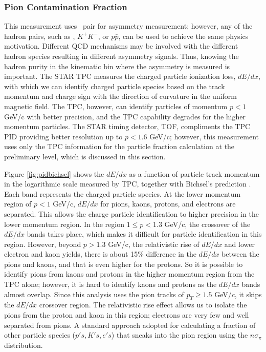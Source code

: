 \subsubsection{Pion Contamination Fraction}
 This measurement uses \pip\ pair for asymmetry measurement; however, any of the hadron pairs, such as \pip, $K^+K^-$, or $p\bar{p}$, can be used to achieve the same physics motivation. Different QCD mechanisms may be involved with the different hadron species resulting in different asymmetry signals. Thus, knowing the hadron purity in the kinematic bin where the asymmetry is measured is important. The STAR TPC measures the charged particle ionization loss, $dE/dx$, with which we can identify charged  particle species based on the track momentum and charge sign with the direction of curvature in the uniform magnetic field. The TPC, however, can identify particles of momentum $p < 1$ GeV/c with better precision, and the TPC capability degrades for the higher momentum particles. The STAR timing detector, TOF, compliments the TPC PID providing better resolution up to $p < 1.6 $ GeV/c; however, this measurement uses only the TPC information for the particle fraction calculation at the preliminary level, which is discussed in this section.

Figure \ref{fig:pidbichsel} shows the $dE/dx$ as a function of particle track momentum in the logarithmic scale measured by TPC, together with Bichsel's prediction \cite{Shao:2005iu}. Each band represents the charged particle species. At the lower momentum region of $p<1$ GeV/c, $dE/dx$ for pions, kaons, protons, and electrons are separated. This allows the charge particle identification to higher precision in the lower momentum region. In the region $1 \leq p < 1.3$ GeV/c, the crossover of the $dE/dx$ bands takes place, which makes it difficult for particle identification in this region. However, beyond $p >1.3$ GeV/c, the relativistic rise of $dE/dx$ and lower electron and kaon yields, there is about 15\% difference in the $dE/dx$ between the pions and kaons, and that is even higher for the protons. So it is possible to identify pions from kaons and protons in the higher momentum region from the TPC alone; however, it is hard to identify kaons and protons as the  $dE/dx$ bands almost overlap. Since this analysis uses the pion tracks of $p_T\geq 1.5$ GeV/$c$, it skips the $dE/dx$ crossover region. The relativistic rise effect allows us to isolate the pions from the proton and kaon in this region; electrons are very few and well separated from pions. A standard approach adopted for calculating a fraction of other particle species ($p's, K's, e's$) that sneaks into the pion region using the $n\sigma_\pi$ distribution.

